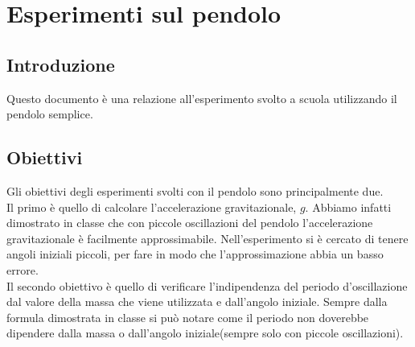 \documentclass{article}
\begin{document}
\section{Esperimenti sul pendolo}
\subsection{Introduzione}
Questo documento è una relazione all'esperimento svolto a scuola utilizzando il pendolo semplice.
\subsection{Obiettivi}
Gli obiettivi degli esperimenti svolti con il pendolo sono principalmente due. \\
Il primo è quello di calcolare l'accelerazione gravitazionale, $g$. Abbiamo infatti dimostrato in classe che con piccole oscillazioni del pendolo l'accelerazione gravitazionale è facilmente approssimabile. Nell'esperimento si è cercato di tenere angoli iniziali piccoli, per fare in modo che l'approssimazione abbia un basso errore. \\
Il secondo obiettivo è quello di verificare l'indipendenza del periodo d'oscillazione dal valore della massa che viene utilizzata e dall'angolo iniziale. Sempre dalla formula dimostrata in classe si può notare come il periodo non doverebbe dipendere dalla massa o dall'angolo iniziale(sempre solo con piccole oscillazioni).
\end{document}
